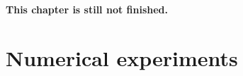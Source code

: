 \documentclass[../../main.tex]{subfiles} %
\begin{document}
	
{\color{red} \textbf{This chapter is still not finished.}}

\section{Numerical experiments}
\end{document}
